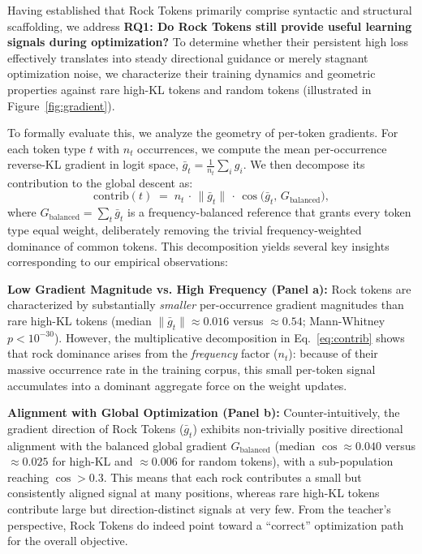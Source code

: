 Having established that Rock Tokens primarily comprise syntactic and structural scaffolding, we address \textbf{RQ1: Do Rock Tokens still provide useful learning signals during optimization?} To determine whether their persistent high loss effectively translates into steady directional guidance or merely stagnant optimization noise, we characterize their training dynamics and geometric properties against rare high-KL tokens and random tokens (illustrated in Figure~\ref{fig:gradient}). 

To formally evaluate this, we analyze the geometry of per-token gradients. For each token type $t$ with $n_{t}$ occurrences, we compute the mean per-occurrence reverse-KL gradient in logit space, $\bar{g}_{t} = \tfrac{1}{n_{t}} \sum_{i} g_{i}$. We then decompose its contribution to the global descent as:
\begin{equation}
\mathrm{contrib}(t) \;=\; n_{t} \,\cdot\, \|\bar{g}_{t}\| \,\cdot\, \cos\bigl(\bar{g}_{t},\, G_{\mathrm{balanced}}\bigr),
\label{eq:contrib}
\end{equation}
where $G_{\mathrm{balanced}} = \sum_{t} \bar{g}_{t}$ is a frequency-balanced reference that grants every token type equal weight, deliberately removing the trivial frequency-weighted dominance of common tokens. This decomposition yields several key insights corresponding to our empirical observations:

\textbf{Low Gradient Magnitude vs. High Frequency (Panel a):} 
Rock tokens are characterized by substantially \emph{smaller} per-occurrence gradient magnitudes than rare high-KL tokens (median $\|\bar{g}_{t}\| \approx 0.016$ versus $\approx 0.54$; Mann-Whitney $p < 10^{-30}$). However, the multiplicative decomposition in Eq.~\ref{eq:contrib} shows that rock dominance arises from the \emph{frequency} factor ($n_t$): because of their massive occurrence rate in the training corpus, this small per-token signal accumulates into a dominant aggregate force on the weight updates.

\textbf{Alignment with Global Optimization (Panel b):} 
Counter-intuitively, the gradient direction of Rock Tokens ($\bar{g}_t$) exhibits non-trivially positive directional alignment with the balanced global gradient $G_{\mathrm{balanced}}$ (median $\cos \approx 0.040$ versus $\approx 0.025$ for high-KL and $\approx 0.006$ for random tokens), with a sub-population reaching $\cos > 0.3$. This means that each rock contributes a small but consistently aligned signal at many positions, whereas rare high-KL tokens contribute large but direction-distinct signals at very few. From the teacher's perspective, Rock Tokens do indeed point toward a ``correct'' optimization path for the overall objective.

